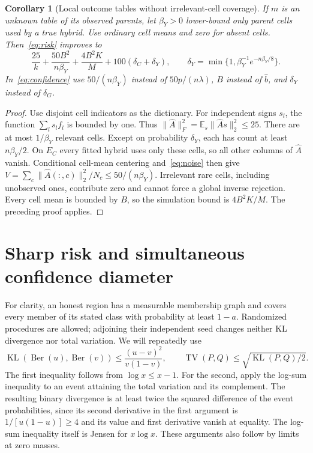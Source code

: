 \documentclass[11pt,a4paper]{article}
\numberwithin{equation}{section}
\newtheorem{corollary}[theorem]{Corollary}
\theoremstyle{definition}
\newcommand{\E}{\mathbb E}
\DeclareMathOperator{\KL}{KL}
\DeclareMathOperator{\TV}{TV}
\begin{document}
\begin{corollary}[Local outcome tables without irrelevant-cell coverage]\label{cor:table}
If $m$ is an unknown table of its observed parents, let $\beta_Y>0$
lower-bound only parent cells used by a true hybrid. Use ordinary cell
means and zero for absent cells. Then~\eqref{eq:risk} improves to
\begin{equation}\label{eq:table-risk}
 \frac{25}{k}+\frac{50B^2}{n\beta_Y}+\frac{4B^2K}{M}
 +100(\delta_C+\delta_Y),\qquad
 \delta_Y=\min\{1,\beta_Y^{-1}e^{-n\beta_Y/8}\}.
\end{equation}
In~\eqref{eq:confidence} use $50/(n\beta_Y)$ instead of $50p/(n\lambda)$,
$B$ instead of $\widehat b$, and $\delta_Y$ instead of $\delta_G$.
\end{corollary}
\begin{proof}
Use disjoint cell indicators as the dictionary. For independent signs $s_l$,
the function $\sum_l s_l f_l$ is bounded by one. Thus
$\|\widehat A\|_F^2=\E_s\|\widehat A s\|_2^2\le25$.
There are at most $1/\beta_Y$ relevant cells. Except on probability
$\delta_Y$, each has count at least $n\beta_Y/2$. On $E_C$ every fitted
hybrid uses only these cells, so all other columns of $\widehat A$ vanish.
Conditional cell-mean centering and~\eqref{eq:noise} then give
$V=\sum_c\|\widehat A(:,c)\|_2^2/N_c\le50/(n\beta_Y)$.
Irrelevant rare cells, including unobserved ones, contribute zero and
cannot force a global inverse rejection. Every cell mean is bounded by
$B$, so the simulation bound is $4B^2K/M$. The preceding proof applies.
\end{proof}

\section{Sharp risk and simultaneous confidence diameter}\label{sec:sharp}

For clarity, an honest region has a measurable membership graph and
covers every member of its stated class with probability at least $1-a$.
Randomized procedures are allowed; adjoining their independent seed
changes neither KL divergence nor total variation. We will repeatedly use
\begin{equation}\label{eq:bern-kl}
 \KL(\operatorname{Ber}(u),\operatorname{Ber}(v))
 \le\frac{(u-v)^2}{v(1-v)},\qquad
 \TV(P,Q)\le\sqrt{\KL(P,Q)/2}.
\end{equation}
The first inequality follows from $\log x\le x-1$. For the second,
apply the log-sum inequality to an event attaining the total variation
and its complement. The resulting binary divergence is at least twice
the squared difference of the event probabilities, since its second
derivative in the first argument is $1/[u(1-u)]\ge4$ and its value and
first derivative vanish at equality. The log-sum inequality itself is
Jensen for $x\log x$. These arguments also follow by limits at zero masses.
\end{document}
